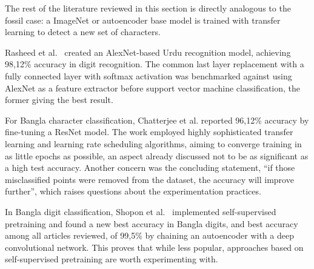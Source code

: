 \documentclass[english,twoside,openright]{UH_DS_MSc}
\begin{document}
The rest of the literature reviewed in this section is directly analogous 
to the fossil case: a ImageNet or autoencoder base model is trained with transfer learning to detect a new set of characters.



Rasheed et al.~\cite{5rasheedHandwrittenUrduWAlexNet} created an AlexNet-based Urdu recognition 
model, achieving 98,12\% accuracy in digit recognition. The common last layer replacement 
with a fully connected layer with softmax activation was benchmarked against using AlexNet as 
a feature extractor before support vector 
machine classification, the former giving the best result.



For Bangla character classification, Chatterjee et al. reported 96,12\% accuracy 
by fine-tuning a ResNet model. The work employed highly sophisticated transfer
 learning and learning rate scheduling algorithms, aiming to converge training in as 
 little epochs as possible, an aspect already discussed not to be as significant as a high test accuracy.
  Another concern was the concluding statement, ``if those misclassified points were 
  removed from the dataset, the accuracy will improve further'', which raises questions about the experimentation practices.



In Bangla digit classification, Shopon et al.~\cite{6shoponBangla} implemented self-supervised 
pretraining and found a new best accuracy in Bangla digits,
and best accuracy among all articles reviewed, of 99,5\% by chaining an autoencoder
with a deep convolutional network. This proves that while less popular, approaches based on self-supervised pretraining  are worth experimenting with.
\end{document}
